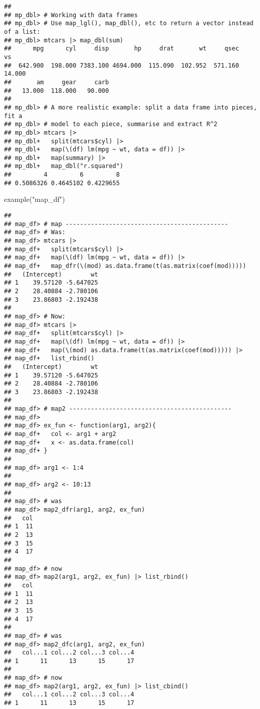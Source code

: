 \documentclass[
]{book}
\newenvironment{Shaded}{\begin{snugshade}}{\end{snugshade}}
\newcommand{\FunctionTok}[1]{\textcolor[rgb]{0.00,0.00,0.00}{#1}}
\newcommand{\NormalTok}[1]{#1}
\newcommand{\StringTok}[1]{\textcolor[rgb]{0.31,0.60,0.02}{#1}}
\begin{document}
\begin{verbatim}
## 
## mp_dbl> # Working with data frames
## mp_dbl> # Use map_lgl(), map_dbl(), etc to return a vector instead of a list:
## mp_dbl> mtcars |> map_dbl(sum)
##      mpg      cyl     disp       hp     drat       wt     qsec       vs 
##  642.900  198.000 7383.100 4694.000  115.090  102.952  571.160   14.000 
##       am     gear     carb 
##   13.000  118.000   90.000 
## 
## mp_dbl> # A more realistic example: split a data frame into pieces, fit a
## mp_dbl> # model to each piece, summarise and extract R^2
## mp_dbl> mtcars |>
## mp_dbl+   split(mtcars$cyl) |>
## mp_dbl+   map(\(df) lm(mpg ~ wt, data = df)) |>
## mp_dbl+   map(summary) |>
## mp_dbl+   map_dbl("r.squared")
##         4         6         8 
## 0.5086326 0.4645102 0.4229655
\end{verbatim}

\begin{Shaded}
\begin{Highlighting}[]
\FunctionTok{example}\NormalTok{(}\StringTok{"map\_df"}\NormalTok{)}
\end{Highlighting}
\end{Shaded}

\begin{verbatim}
## 
## map_df> # map ---------------------------------------------
## map_df> # Was:
## map_df> mtcars |>
## map_df+   split(mtcars$cyl) |>
## map_df+   map(\(df) lm(mpg ~ wt, data = df)) |>
## map_df+   map_dfr(\(mod) as.data.frame(t(as.matrix(coef(mod)))))
##   (Intercept)        wt
## 1    39.57120 -5.647025
## 2    28.40884 -2.780106
## 3    23.86803 -2.192438
## 
## map_df> # Now:
## map_df> mtcars |>
## map_df+   split(mtcars$cyl) |>
## map_df+   map(\(df) lm(mpg ~ wt, data = df)) |>
## map_df+   map(\(mod) as.data.frame(t(as.matrix(coef(mod))))) |>
## map_df+   list_rbind()
##   (Intercept)        wt
## 1    39.57120 -5.647025
## 2    28.40884 -2.780106
## 3    23.86803 -2.192438
## 
## map_df> # map2 ---------------------------------------------
## map_df> 
## map_df> ex_fun <- function(arg1, arg2){
## map_df+   col <- arg1 + arg2
## map_df+   x <- as.data.frame(col)
## map_df+ }
## 
## map_df> arg1 <- 1:4
## 
## map_df> arg2 <- 10:13
## 
## map_df> # was
## map_df> map2_dfr(arg1, arg2, ex_fun)
##   col
## 1  11
## 2  13
## 3  15
## 4  17
## 
## map_df> # now
## map_df> map2(arg1, arg2, ex_fun) |> list_rbind()
##   col
## 1  11
## 2  13
## 3  15
## 4  17
## 
## map_df> # was
## map_df> map2_dfc(arg1, arg2, ex_fun)
##   col...1 col...2 col...3 col...4
## 1      11      13      15      17
## 
## map_df> # now
## map_df> map2(arg1, arg2, ex_fun) |> list_cbind()
##   col...1 col...2 col...3 col...4
## 1      11      13      15      17
\end{verbatim}
\end{document}
